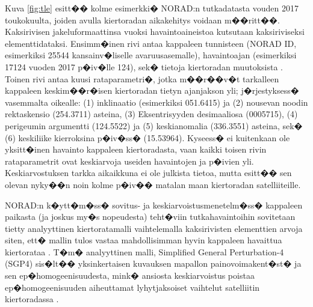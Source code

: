 \documentclass[12pt,a4paper,finnish,margin=2in]{article}
\begin{document}
Kuva \ref{fig:tle} esitt�� kolme esimerkki� NORAD:n tutkadatasta vouden 2017 toukokuulta, joiden avulla kiertoradan aikakehitys voidaan m��ritt��. Kaksirivisen jakeluformaattinsa vuoksi havaintoaineistoa kutsutaan kaksiriviseksi elementtidataksi. Ensimm�inen rivi antaa kappaleen tunnisteen (NORAD ID, esimerkiksi 25544 kansainv�liselle avaruusasemalle), havaintoajan (esimerkiksi 17124 vuoden 2017 p�iv�lle 124), sek� tietoja kiertoradan muutoksista \citep{spacetrack}. Toinen rivi antaa kuusi rataparametri�, jotka m��r��v�t tarkalleen kappaleen keskim��r�isen kiertoradan tietyn ajanjakson yli; j�rjestyksess� vasemmalta oikealle: (1) inklinaatio (esimerkiksi 051.6415) ja (2) nousevan noodin rektaskensio (254.3711) asteina, (3) Eksentrisyyden desimaaliosa (0005715), (4) perigeumin argumentti (124.5522) ja (5) keskianomalia (336.3551) asteina, sek� (6) keskiliike kierroksina p�iv�ss� (15.53964). Kyseess� ei kuitenkaan ole yksitt�inen havainto kappaleen kiertoradasta, vaan kaikki toisen rivin rataparametrit ovat keskiarvoja useiden havaintojen ja p�ivien yli. Keskiarvostuksen tarkka aikaikkuna ei ole julkista tietoa, mutta \citep{picone_2005} esitt�� sen olevan nyky��n noin kolme p�iv�� matalan maan kiertoradan satelliiteille. 

NORAD:n k�ytt�m�ss� sovitus- ja keskiarvoistusmenetelm�ss� kappaleen paikasta (ja joskus my�s nopeudesta) teht�viin tutkahavaintoihin sovitetaan tietty analyyttinen kiertoratamalli vaihtelemalla kaksirivisten elementtien arvoja siten, ett� mallin tulos vastaa mahdollisimman hyvin kappaleen havaittua kiertorataa \citep{hoots_1980}. T�m� analyyttinen malli, Simplified General Perturbation-4 (SGP4) \citep{lane_1979} sis�lt�� yksinkertaisen kuvauksen mapallon painovoimakent�st� ja sen ep�homogeenisuudesta, mink� ansiosta keskiarvoistus poistaa ep�homogeenisuuden aiheuttamat lyhytjaksoiset vaihtelut satelliitin kiertoradassa \citep{picone_2005}. 
\end{document}
